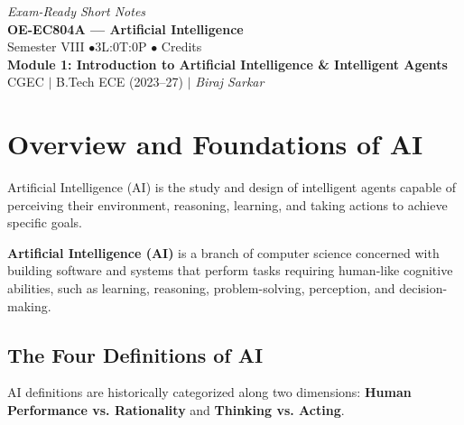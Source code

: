 \documentclass[12pt,a4paper]{article}
\begin{document}
\begin{center}
  \hfill \textit{Exam-Ready Short Notes} \\
  \vspace{6pt}
  {\LARGE\bfseries\color{myred} OE-EC804A --- Artificial Intelligence}\\[5pt]
  {\normalsize\color{mydark} Semester VIII \quad$\bullet$\quad 3L:0T:0P \quad$\bullet$ Credits}\\[3pt]
  {\normalsize\color{myteal}\textbf{Module 1: Introduction to Artificial Intelligence \& Intelligent Agents}}\\[3pt]
  {\small\color{mydark} CGEC \;$|$\; B.Tech ECE (2023--27) \;$|$\; \textit{Biraj Sarkar}}
\end{center}
\vspace{2pt}
\noindent{\color{myred}\rule{\linewidth}{1.5pt}}
\vspace{2pt}

\hypersetup{linkcolor=mydark}
\tableofcontents
\hypersetup{linkcolor=myteal}
\newpage

\section{Overview and Foundations of AI}

Artificial Intelligence (AI) is the study and design of intelligent agents capable of perceiving their environment, reasoning, learning, and taking actions to achieve specific goals.

\begin{tcolorbox}[defbox, title={Definition of Artificial Intelligence}]
  \textbf{Artificial Intelligence (AI)} is a branch of computer science concerned with building software and systems that perform tasks requiring human-like cognitive abilities, such as learning, reasoning, problem-solving, perception, and decision-making.
\end{tcolorbox}

\subsection{The Four Definitions of AI}
AI definitions are historically categorized along two dimensions: \textbf{Human Performance vs. Rationality} and \textbf{Thinking vs. Acting}.
\end{document}
